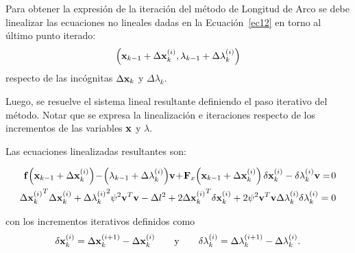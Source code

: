 Para obtener la expresión de la iteración del método de Longitud de Arco se debe linealizar las ecuaciones no lineales dadas en la Ecuación~\eqref{ec12} en torno al último punto iterado: 
$$\left({\bf x}_{k-1}+\Delta {\bf x}_k^{(i)}, \lambda_{k-1}+\Delta \lambda_k^{(i)}\right)$$  respecto de las incógnitas $\Delta {\bf x}_k$ y $\Delta \lambda_k$.

Luego, se resuelve el sistema lineal resultante definiendo el paso iterativo del método. %
%
Notar que se expresa la linealización e iteraciones respecto de los incrementos de las variables ${\bf x}$ y $\lambda$.

Las ecuaciones linealizadas resultantes son:
%
%
\begin{small}
\begin{eqnarray}\label{ec12b}
\bff\!\left(\bfx_{k-1}+\Delta \bfx_k^{(i)}\right)\!-\!\left(\lambda_{k-1}+\Delta \lambda_k^{(i)}\right)\!\bfv\!+\!\bfF_x\!\left(\bfx_{k-1} +\Delta \bfx_k^{(i)}\right) \delta \bfx_k^{(i)} - \delta \lambda_k^{(i)} \bfv =\!0\\
{\Delta \bfx_k^{(i)}}^T \Delta \bfx_k^{(i)} + {\Delta \lambda_k^{(i)}}^2 \psi^2 \bfv^T\bfv - \Delta l^2 +
2{\Delta \bfx_k^{(i)}}^T\delta \bfx_k^{(i)} + 2\psi^2\bfv^T\bfv\Delta \lambda_k^{(i)}\delta \lambda_k^{(i)} = 0
\end{eqnarray}
%
\end{small}
con los incrementos iterativos definidos como
\begin{equation}\label{ec13}
		\delta {\bf x}_k^{(i)}=\Delta {\bf x}_k^{(i+1)}-\Delta {\bf x}_k^{(i)} \qquad \text{y} \qquad
		\delta \lambda_k^{(i)}=\Delta \lambda_k^{(i+1)}-\Delta \lambda_k^{(i)}		.
\end{equation}

